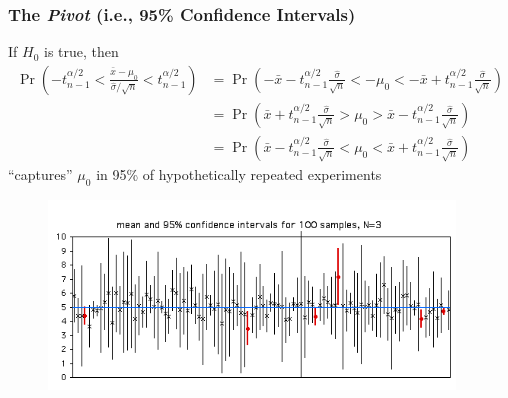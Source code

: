 \documentclass[xcolor={dvipsnames}]{beamer}
\begin{document}
\frame
{
 \frametitle{The \emph{Pivot} (i.e., 95\% Confidence Intervals)}

If $H_0$ is true, then 
\footnotesize
\begin{align*}
\Pr\left( -t_{n-1}^{\alpha/2} < \frac{\bar x - \mu_0} {\hat \sigma /\sqrt{n}} < t_{n-1}^{\alpha/2}\right) &=  \Pr\left( -\bar x -t_{n-1}^{\alpha/2} \frac{\hat \sigma}{\sqrt{n}} < - \mu_0 <  -\bar x  +t_{n-1}^{\alpha/2} \frac{\hat \sigma}{\sqrt{n}} \right)\\
&=  \Pr\left( \bar x +t_{n-1}^{\alpha/2} \frac{\hat \sigma}{\sqrt{n}} > \mu_0 >  \bar x  - t_{n-1}^{\alpha/2} \frac{\hat \sigma}{\sqrt{n}} \right)\\
&= \Pr\left( \bar x - t_{n-1}^{\alpha/2} \frac{\hat \sigma}{\sqrt{n}} < \mu_0 <  \bar x  + t_{n-1}^{\alpha/2} \frac{\hat \sigma}{\sqrt{n}} \right)
\end{align*}
\normalsize
``captures'' $\mu_0$ in 95\% of hypothetically repeated experiments 

\vspace{-1em}
\begin{figure}
\centering
\includegraphics[width=4.25in]{stuff/conf1.png}
\end{figure}
}
\end{document}

